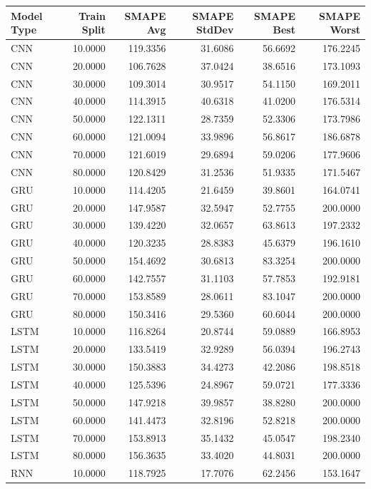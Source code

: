 \begin{tabular}{lrrrrr}
\toprule
Model Type & Train Split & SMAPE Avg & SMAPE StdDev & SMAPE Best & SMAPE Worst \\
\midrule
CNN & 10.0000 & 119.3356 & 31.6086 & 56.6692 & 176.2245 \\
CNN & 20.0000 & 106.7628 & 37.0424 & 38.6516 & 173.1093 \\
CNN & 30.0000 & 109.3014 & 30.9517 & 54.1150 & 169.2011 \\
CNN & 40.0000 & 114.3915 & 40.6318 & 41.0200 & 176.5314 \\
CNN & 50.0000 & 122.1311 & 28.7359 & 52.3306 & 173.7986 \\
CNN & 60.0000 & 121.0094 & 33.9896 & 56.8617 & 186.6878 \\
CNN & 70.0000 & 121.6019 & 29.6894 & 59.0206 & 177.9606 \\
CNN & 80.0000 & 120.8429 & 31.2536 & 51.9335 & 171.5467 \\
GRU & 10.0000 & 114.4205 & 21.6459 & 39.8601 & 164.0741 \\
GRU & 20.0000 & 147.9587 & 32.5947 & 52.7755 & 200.0000 \\
GRU & 30.0000 & 139.4220 & 32.0657 & 63.8613 & 197.2332 \\
GRU & 40.0000 & 120.3235 & 28.8383 & 45.6379 & 196.1610 \\
GRU & 50.0000 & 154.4692 & 30.6813 & 83.3254 & 200.0000 \\
GRU & 60.0000 & 142.7557 & 31.1103 & 57.7853 & 192.9181 \\
GRU & 70.0000 & 153.8589 & 28.0611 & 83.1047 & 200.0000 \\
GRU & 80.0000 & 150.3416 & 29.5360 & 60.6044 & 200.0000 \\
LSTM & 10.0000 & 116.8264 & 20.8744 & 59.0889 & 166.8953 \\
LSTM & 20.0000 & 133.5419 & 32.9289 & 56.0394 & 196.2743 \\
LSTM & 30.0000 & 150.3883 & 34.4273 & 42.2086 & 198.8518 \\
LSTM & 40.0000 & 125.5396 & 24.8967 & 59.0721 & 177.3336 \\
LSTM & 50.0000 & 147.9218 & 39.9857 & 38.8280 & 200.0000 \\
LSTM & 60.0000 & 141.4473 & 32.8196 & 52.8218 & 200.0000 \\
LSTM & 70.0000 & 153.8913 & 35.1432 & 45.0547 & 198.2340 \\
LSTM & 80.0000 & 156.3635 & 33.4020 & 44.8031 & 200.0000 \\
RNN & 10.0000 & 118.7925 & 17.7076 & 62.2456 & 153.1647 \\

\end{tabular}
